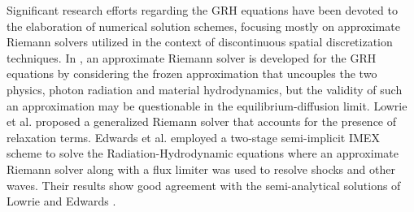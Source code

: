 \documentclass[times,doublespace]{fldauth}%
\begin{document}
%
Significant research efforts regarding the GRH equations have been devoted to the elaboration of numerical solution schemes, focusing mostly on approximate Riemann solvers utilized in the context of discontinuous spatial discretization techniques.
In \cite{Balsara}, an approximate Riemann solver is developed for the GRH equations by considering the frozen approximation that uncouples the two physics, photon radiation and material hydrodynamics, but the validity of such an approximation may be questionable in the equilibrium-diffusion limit.
Lowrie et al. \cite{LowrieMorelHittinger} proposed a generalized Riemann solver that accounts for the presence of relaxation terms.
Edwards et al. \cite{EdwardsMorelLowrie} employed a two-stage semi-implicit IMEX scheme to solve the Radiation-Hydrodynamic equations where an approximate Riemann solver along with a flux limiter was used to resolve shocks and other waves. 
Their results show good agreement with the semi-analytical solutions of Lowrie and Edwards \cite{LowrieEdwards}.
%
%
\end{document}
